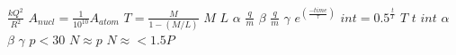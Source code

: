 \documentclass{article}
\begin{document}
$\frac{kQ^2}{R^2}$
$A_{nucl} = \frac{1}{10^{10}} A_{atom}$
$T = \frac{M}{1-(M/L)}$
$M$
$L$
$\alpha$
$\frac{q}{m}$
$\beta$
$\frac{q}{m}$
$\gamma$
$e^(\frac{-time}{\tau})$
$int = 0.5^{\frac{t}{T}}$
$T$
$t$
$int$
$\alpha$
$\beta$
$\gamma$
$p < 30$
$N \approx p$
$N \approx < 1.5P$
\end{document}
